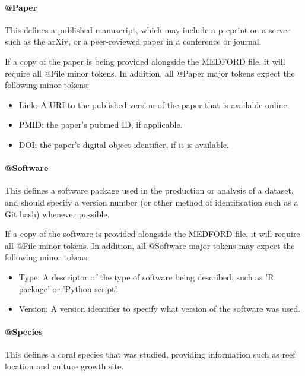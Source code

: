 \documentclass[10pt]{article}
\begin{document}
    \paragraph{@Paper}
    
    This defines a published manuscript, which may include a preprint on a server such as the arXiv, or a peer-reviewed paper in a conference or journal.
    
    If a copy of the paper is being provided alongside the MEDFORD file, it will require all @File minor tokens. In addition, all @Paper major tokens expect the following minor tokens:
    \begin{itemize}
        \item Link: A URI to the published version of the paper that is available online.
        \item PMID: the paper's pubmed ID, if applicable.
        \item DOI: the paper's digital object identifier, if it is available.
    \end{itemize}
    
    \paragraph{@Software}
    
    This defines a software package used in the production or analysis of a dataset, and should specify a version number (or other method of identification such as a Git hash) whenever possible.
    
    If a copy of the software is provided alongside the MEDFORD file, it will require all @File minor tokens. In addition, all @Software major tokens may expect the following minor tokens:
    \begin{itemize}
        \item Type: A descriptor of the type of software being described, such as 'R package' or 'Python script'.
        \item Version: A version identifier to specify what version of the software was used.
    \end{itemize}
    
    \paragraph{@Species}
    
    This defines a coral species that was studied, providing information such as reef location and culture growth site.
    
\end{document}
